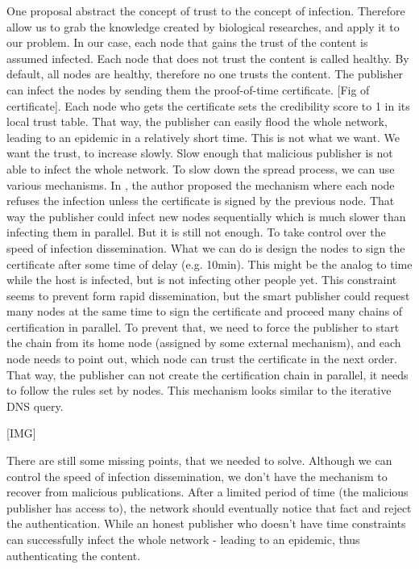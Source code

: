 \documentclass[nostrict]{szablonPG}
\begin{document}
One proposal\cite{konorski2019mitigating} abstract the concept of trust to the concept of infection. Therefore allow us to grab the knowledge created by biological researches, and apply it to our problem. In our case, each node that gains the trust of the content is assumed infected. Each node that does not trust the content is called healthy. By default, all nodes are healthy, therefore no one trusts the content.
The publisher can infect the nodes by sending them the proof-of-time certificate. [Fig of certificate].
Each node who gets the certificate sets the credibility score to 1 in its local trust table. That way, the publisher can easily flood the whole network, leading to an epidemic in a relatively short time.  This is not what we want. We want the trust, to increase slowly. Slow enough that malicious publisher is not able to infect the whole network. To slow down the spread process, we can use various mechanisms. In \cite{konorski2019mitigating}, the author proposed the mechanism where each node refuses the infection unless the certificate is signed by the previous node. That way the publisher could infect new nodes sequentially which is much slower than infecting them in parallel. But it is still not enough. To take control over the speed of infection dissemination. What we can do is design the nodes to sign the certificate after some time of delay (e.g. 10min). This might be the analog to time while the host is infected, but is not infecting other people yet. This constraint seems to prevent form rapid dissemination, but the smart publisher could request many nodes at the same time to sign the certificate and proceed many chains of certification in parallel. To prevent that, we need to force the publisher to start the chain from its home node (assigned by some external mechanism), and each node needs to point out, which node can trust the certificate in the next order. That way, the publisher can not create the certification chain in parallel, it needs to follow the rules set by nodes. This mechanism looks similar to the iterative DNS query.

[IMG]

There are still some missing points, that we needed to solve. Although we can control the speed of infection dissemination, we don't have the mechanism to recover from malicious publications.  After a limited period of time (the malicious publisher has access to), the network should eventually notice that fact and reject the authentication. While an honest publisher who doesn't have time constraints can successfully infect the whole network - leading to an epidemic, thus authenticating the content. 
\end{document}

